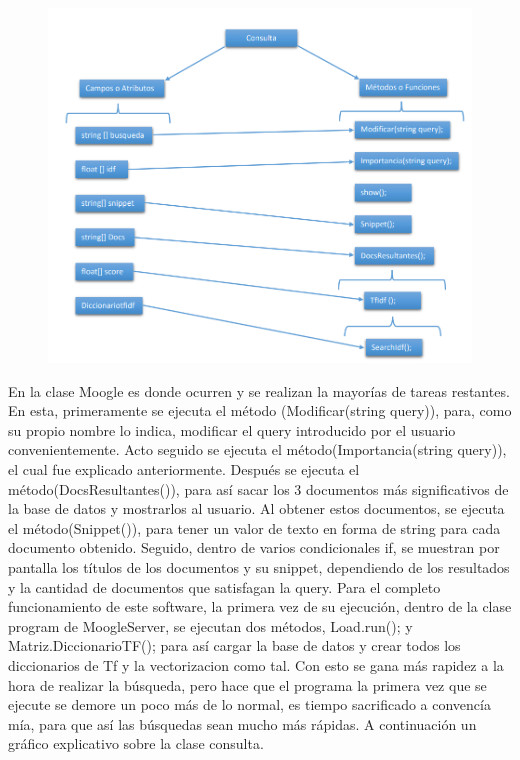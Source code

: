 \documentclass[a4paper,12pt]{article}
\begin{document}
\begin{figure}[h]
    \includegraphics*[width=17cm]{Grafico 4.png}
    \end{figure}
    
    En la clase Moogle es donde ocurren y se realizan la mayorías de tareas restantes. En esta, 
primeramente se ejecuta el método (Modificar(string query)), para, como su propio nombre lo 
indica, modificar el query introducido por el usuario convenientemente. Acto seguido se 
ejecuta el método(Importancia(string query)), el cual fue explicado anteriormente. Después se 
ejecuta el método(DocsResultantes()), para así sacar los 3 documentos más significativos de la 
base de datos y mostrarlos al usuario. Al obtener estos documentos, se ejecuta el 
método(Snippet()), para tener un valor de texto en forma de string para cada documento 
obtenido. Seguido, dentro de varios condicionales if, se muestran por pantalla los títulos de los 
documentos y su snippet, dependiendo de los resultados y la cantidad de documentos que 
satisfagan la query. Para el completo funcionamiento de este software, la primera vez de su 
ejecución, dentro de la clase program de MoogleServer, se ejecutan dos métodos, Load.run();
y Matriz.DiccionarioTF(); para así cargar la base de datos y crear todos los diccionarios de Tf y 
la vectorizacion como tal. Con esto se gana más rapidez a la hora de realizar la búsqueda, pero 
hace que el programa la primera vez que se ejecute se demore un poco más de lo normal, es 
tiempo sacrificado a convencía mía, para que así las búsquedas sean mucho más rápidas. 
\linebreak
A continuación un gráfico explicativo sobre la clase consulta.
 

        



 
\end{document}
